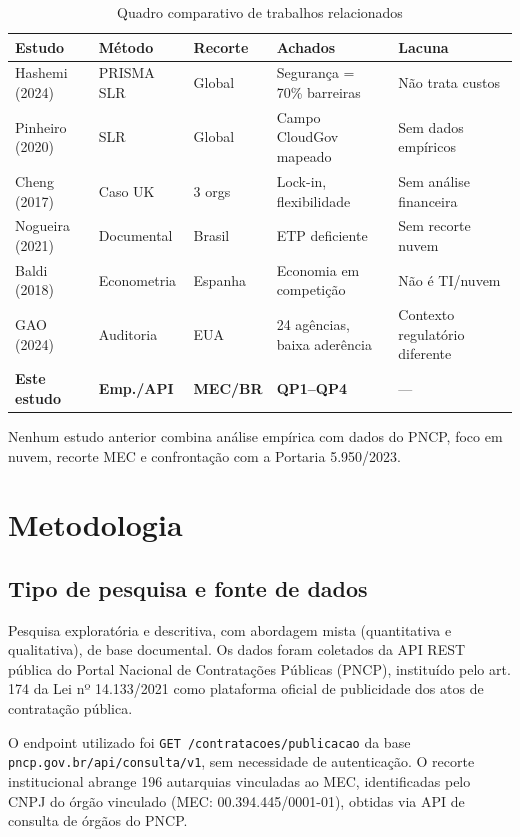 \documentclass[12pt]{article}
\begin{document}
\begin{table}[ht]
\centering
\caption{Quadro comparativo de trabalhos relacionados}
\label{tab:comparativo}
\footnotesize
\begin{tabular}{p{2cm}p{1.7cm}p{1.4cm}p{2.8cm}p{2.8cm}}
\toprule
\textbf{Estudo} & \textbf{Método} & \textbf{Recorte} & \textbf{Achados} & \textbf{Lacuna} \\
\midrule
Hashemi (2024) & PRISMA SLR & Global & Segurança = 70\% barreiras & Não trata custos \\
Pinheiro (2020) & SLR & Global & Campo CloudGov mapeado & Sem dados empíricos \\
Cheng (2017) & Caso UK & 3 orgs & Lock-in, flexibilidade & Sem análise financeira \\
Nogueira (2021) & Documental & Brasil & ETP deficiente & Sem recorte nuvem \\
Baldi (2018) & Econometria & Espanha & Economia em competição & Não é TI/nuvem \\
GAO (2024) & Auditoria & EUA & 24 agências, baixa aderência & Contexto regulatório diferente \\
\midrule
\textbf{Este estudo} & \textbf{Emp./API} & \textbf{MEC/BR} & \textbf{QP1--QP4} & --- \\
\bottomrule
\end{tabular}
\end{table}

Nenhum estudo anterior combina análise empírica com dados do PNCP, foco em nuvem, recorte MEC e confrontação com a Portaria 5.950/2023.

\section{Metodologia}
\label{sec:metodologia}

\subsection{Tipo de pesquisa e fonte de dados}

Pesquisa exploratória e descritiva, com abordagem mista (quantitativa e qualitativa), de base documental. Os dados foram coletados da API REST pública do Portal Nacional de Contratações Públicas (PNCP), instituído pelo art. 174 da Lei nº 14.133/2021 como plataforma oficial de publicidade dos atos de contratação pública.

O endpoint utilizado foi \texttt{GET /contratacoes/publicacao} da base \texttt{pncp.gov.br/api/consulta/v1}, sem necessidade de autenticação. O recorte institucional abrange 196 autarquias vinculadas ao MEC, identificadas pelo CNPJ do órgão vinculado (MEC: 00.394.445/0001-01), obtidas via API de consulta de órgãos do PNCP.
\end{document}
